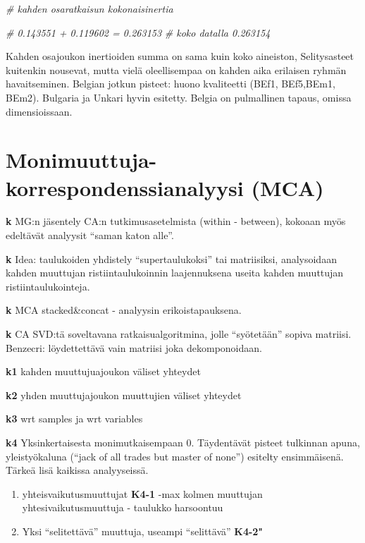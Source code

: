 \documentclass[
  finnish,
]{book}
\newenvironment{Shaded}{\begin{snugshade}}{\end{snugshade}}
\newcommand{\CommentTok}[1]{\textcolor[rgb]{0.56,0.35,0.01}{\textit{#1}}}
\begin{document}
\begin{Shaded}
\begin{Highlighting}[]
\CommentTok{# kahden osaratkaisun kokonaisinertia}

\CommentTok{# 0.143551 + 0.119602 = 0.263153}
\CommentTok{# koko datalla 0.263154}
\end{Highlighting}
\end{Shaded}

Kahden osajoukon inertioiden summa on sama kuin koko aineiston, Selitysasteet
kuitenkin nousevat, mutta vielä oleellisempaa on kahden aika erilaisen ryhmän havaitseminen. Belgian jotkun pisteet: huono kvaliteetti (BEf1, BEf5,BEm1, BEm2). Bulgaria ja Unkari hyvin esitetty. Belgia on pulmallinen tapaus, omissa dimensioissaan.

\hypertarget{monimuuttuja-korrespondenssianalyysi-mca}{%
\chapter{Monimuuttuja-korrespondenssianalyysi (MCA)}\label{monimuuttuja-korrespondenssianalyysi-mca}}

\textbf{k} MG:n jäsentely CA:n tutkimusasetelmista (within - between), kokoaan myös
edeltävät analyysit ``saman katon alle''.

\textbf{k} Idea: taulukoiden yhdistely ``supertaulukoksi'' tai matriisiksi, analysoidaan kahden muuttujan
ristiintaulukoinnin laajennuksena useita kahden muuttujan ristiintaulukointeja.

\textbf{k} MCA stacked\&concat - analyysin erikoistapauksena.

\textbf{k} CA SVD:tä soveltavana ratkaisualgoritmina, jolle ``syötetään'' sopiva matriisi. Benzecri: löydettettävä vain
matriisi joka dekomponoidaan.

\textbf{k1} kahden muuttujuajoukon väliset yhteydet

\textbf{k2} yhden muuttujajoukon muuttujien väliset yhteydet

\textbf{k3} wrt samples ja wrt variables

\textbf{k4} Yksinkertaisesta monimutkaisempaan
0. Täydentävät pisteet tulkinnan apuna, yleistyökaluna (``jack of all trades but
master of none'') esitelty ensimmäisenä. Tärkeä lisä kaikissa analyyseissä.

\begin{enumerate}
\def\labelenumi{\arabic{enumi}.}
\item
  yhteisvaikutusmuuttujat \textbf{K4-1}
  -max kolmen muuttujan yhtesivaikutusmuuttuja - taulukko harsoontuu
\item
  Yksi ``selitettävä'' muuttuja, useampi ``selittävä'' \textbf{K4-2"}
\end{enumerate}
\end{document}
